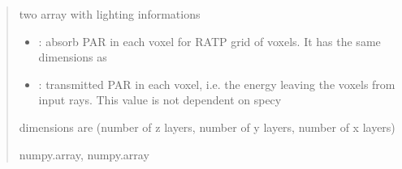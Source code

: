 \documentclass[letterpaper,10pt,english]{sphinxmanual}
\begin{document}
\begin{fulllineitems}
\begin{quote}
\begin{description}
\begin{itemize}
\end{itemize}

\sphinxAtStartPar

\sphinxAtStartPar
two array with lighting informations
\begin{itemize}
\item {} 
\sphinxAtStartPar
{}: absorb PAR in each voxel for RATP grid of voxels. It has the same dimensions as 

\item {} 
\sphinxAtStartPar
{}: transmitted PAR in each voxel, i.e. the energy leaving the voxels from input rays. This value is not dependent on specy

\end{itemize}

\sphinxAtStartPar
dimensions are (number of z layers, number of y layers, number of x layers)


\sphinxAtStartPar
numpy.array, numpy.array

\end{description}\end{quote}

\end{fulllineitems}

\end{document}
